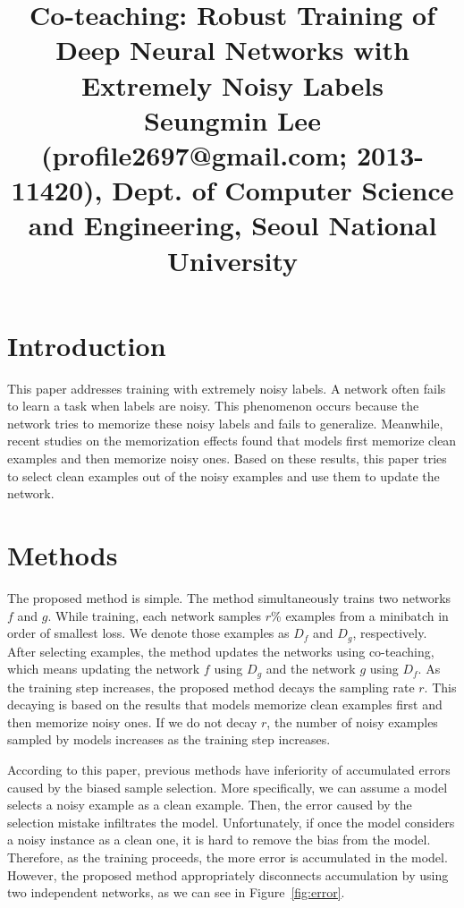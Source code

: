 \documentclass[10pt,twocolumn,letterpaper]{article}
\begin{document}
\title{Co-teaching: Robust Training of Deep Neural Networks with Extremely Noisy Labels \\ {\rm {\normalsize Seungmin Lee (profile2697@gmail.com; 2013-11420), Dept. of Computer Science and Engineering, Seoul National University}}} 

\maketitle
\thispagestyle{empty}


\section{Introduction}
This paper addresses training with extremely noisy labels. A network often fails to learn a task when labels are noisy. This phenomenon occurs because the network tries to memorize these noisy labels and fails to generalize. Meanwhile, recent studies on the memorization effects found that models first memorize clean examples and then memorize noisy ones. Based on these results, this paper tries to select clean examples out of the noisy examples and use them to update the network.

\section{Methods} 
The proposed method is simple. The method simultaneously trains two networks $f$ and $g$. While training, each network samples $r$\% examples from a minibatch in order of smallest loss. We denote those examples as $D_f$ and $D_g$, respectively. After selecting examples, the method updates the networks using co-teaching, which means updating the network $f$ using $D_g$ and the network $g$ using $D_f$. As the training step increases, the proposed method decays the sampling rate  $r$. This decaying is based on the results that models memorize clean examples first and then memorize noisy ones. If we do not decay $r$, the number of noisy examples sampled by models increases as the training step increases.

According to this paper, previous methods have inferiority of accumulated errors caused by the biased sample selection. More specifically, we can assume a model selects a noisy example as a clean example. Then, the error caused by the selection mistake infiltrates the model. Unfortunately, if once the model considers a noisy instance as a clean one, it is hard to remove the bias from the model. Therefore, as the training proceeds, the more error is accumulated in the model. However, the proposed method appropriately disconnects accumulation by using two independent networks, as we can see in Figure~\ref{fig:error}.
\end{document}
